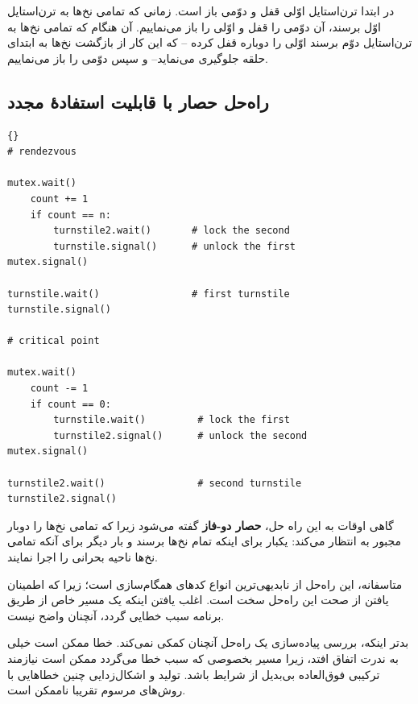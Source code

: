 \documentclass{book}
\newcommand{\clearemptydoublepage}{\newpage\cleardoublepage}
\begin{document}
    در ابتدا ترن‌استایل اوّلی قفل و دوّمی باز است. زمانی که تمامی نخ‌ها به ترن‌استایل اوّل برسند، آن دوّمی را قفل  و اوّلی را باز می‌نماییم. 
    آن هنگام که تمامی نخ‌ها به ترن‌استایل دوّم برسند اوّلی را دوباره قفل کرده --%
    که این کار از بازگشت نخ‌ها به ابتدای حلقه جلوگیری می‌نماید--
    و سپس دوّمی را باز می‌نماییم.


\clearemptydoublepage
\subsection {   راه‌حل حصار با قابلیت استفادهٔ مجدد}


\begin{latin}
\begin{lstlisting}[title=\rl{ راهنمای حصار با قابلیت استفادهٔ مجدد}]{} 
# rendezvous

mutex.wait()
    count += 1
    if count == n:
        turnstile2.wait()       # lock the second
        turnstile.signal()      # unlock the first
mutex.signal()

turnstile.wait()                # first turnstile
turnstile.signal()

# critical point

mutex.wait()
    count -= 1
    if count == 0: 
        turnstile.wait()         # lock the first
        turnstile2.signal()      # unlock the second
mutex.signal()

turnstile2.wait()                # second turnstile
turnstile2.signal()
\end{lstlisting}
\end{latin}

    گاهی اوقات به این راه حل، \textbf{حصار دو-فاز} گفته می‌شود زیرا که تمامی نخ‌ها را دوبار مجبور به انتظار می‌کند: یکبار برای اینکه تمام نخ‌ها برسند و 
    بار دیگر برای آنکه تمامی نخ‌ها ناحیه بحرانی را اجرا نمایند. 

    متاسفانه، این راه‌حل  از نابدیهی‌ترین انواع کدهای همگام‌سازی است؛ زیرا که اطمینان یافتن از صحت این راه‌حل سخت است. 
    اغلب یافتن اینکه یک مسیر خاص از طریق برنامه سبب خطایی گردد، آنچنان واضح نیست.

    بدتر اینکه، بررسی پیاده‌سازی یک راه‌حل آنچنان کمکی نمی‌کند. خطا ممکن است خیلی به ندرت اتفاق افتد، 
    زیرا مسیر بخصوصی که سبب خطا می‌گردد ممکن است نیازمند ترکیبی فوق‌العاده بی‌بدیل از شرایط باشد. 
    تولید و اشکال‌زدایی چنین خطاهایی با روش‌های مرسوم تقریبا ناممکن است. 
    
\end{document}
